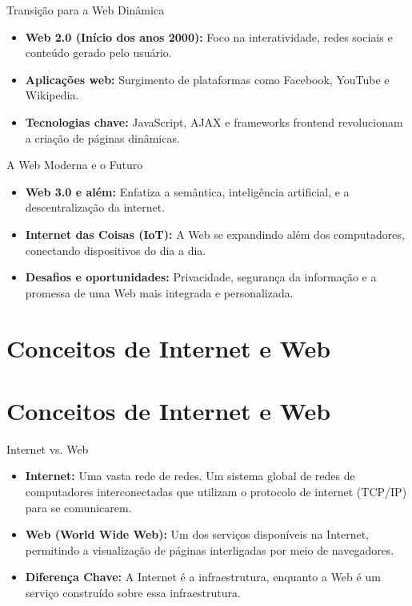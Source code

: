 \begin{frame}{Transição para a Web Dinâmica}
  \begin{itemize}
    \item \textbf{Web 2.0 (Início dos anos 2000):} Foco na interatividade, redes sociais e conteúdo gerado pelo usuário.
    \item \textbf{Aplicações web:} Surgimento de plataformas como Facebook, YouTube e Wikipedia.
    \item \textbf{Tecnologias chave:} JavaScript, AJAX e frameworks frontend revolucionam a criação de páginas dinâmicas.
  \end{itemize}
\end{frame}

\begin{frame}{A Web Moderna e o Futuro}
  \begin{itemize}
    \item \textbf{Web 3.0 e além:} Enfatiza a semântica, inteligência artificial, e a descentralização da internet.
    \item \textbf{Internet das Coisas (IoT):} A Web se expandindo além dos computadores, conectando dispositivos do dia a dia.
    \item \textbf{Desafios e oportunidades:} Privacidade, segurança da informação e a promessa de uma Web mais integrada e personalizada.
  \end{itemize}
\end{frame}


\section{Conceitos de Internet e Web}
\section{Conceitos de Internet e Web}
\begin{frame}{Internet vs. Web}
  \begin{itemize}
    \item \textbf{Internet:} Uma vasta rede de redes. Um sistema global de redes de computadores interconectadas que utilizam o protocolo de internet (TCP/IP) para se comunicarem.
    \item \textbf{Web (World Wide Web):} Um dos serviços disponíveis na Internet, permitindo a visualização de páginas interligadas por meio de navegadores.
    \item \textbf{Diferença Chave:} A Internet é a infraestrutura, enquanto a Web é um serviço construído sobre essa infraestrutura.
  \end{itemize}
\end{frame}

